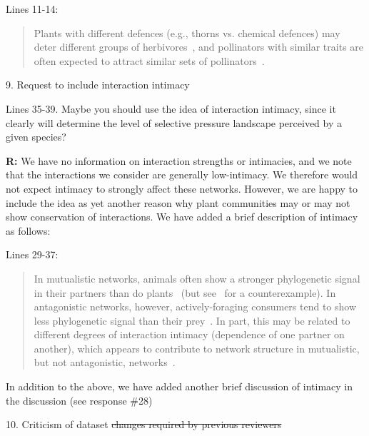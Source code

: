 \documentclass[12pt]{letter}
\newenvironment{refquote}{\bigskip \begin{it}}{\end{it}\smallskip}
\providecommand{\DIFdel}[1]{{\protect\color{red}\sout{#1}}}                      %
\providecommand{\DIFdelbegin}{} %
\providecommand{\DIFdelend}{} %
\newcommand{\DIFscaledelfig}{0.5}
\newlength{\DIFdelgraphicswidth} %
\newlength{\DIFdelgraphicsheight} %
\newcommand{\DIFdelincludegraphics}[2][]{%
\sbox{\DIFdelgraphicsbox}{\DIFOincludegraphics[#1]{#2}}%
\settoboxwidth{\DIFdelgraphicswidth}{\DIFdelgraphicsbox} %
\settoboxtotalheight{\DIFdelgraphicsheight}{\DIFdelgraphicsbox} %
\scalebox{\DIFscaledelfig}{%
\parbox[b]{\DIFdelgraphicswidth}{\usebox{\DIFdelgraphicsbox}\\[-\baselineskip] \rule{\DIFdelgraphicswidth}{0em}}\llap{\resizebox{\DIFdelgraphicswidth}{\DIFdelgraphicsheight}{%
\setlength{\unitlength}{\DIFdelgraphicswidth}%
\begin{picture}(1,1)%
\thicklines\linethickness{2pt} %
{\color[rgb]{1,0,0}\put(0,0){\framebox(1,1){}}}%
{\color[rgb]{1,0,0}\put(0,0){\line( 1,1){1}}}%
{\color[rgb]{1,0,0}\put(0,1){\line(1,-1){1}}}%
\end{picture}%
}\hspace*{3pt}}} %
} %
\DeclareRobustCommand{\DIFdelbegin}{\DIFOdelbegin \let\includegraphics\DIFdelincludegraphics} %
\DeclareRobustCommand{\DIFdelend}{\DIFOaddend \let\includegraphics\DIFOincludegraphics} %
\begin{document}
		Lines 11-14:

		\begin{quotation}

			Plants with different defences 
		  	(e.g., thorns vs. chemical defences) may deter different groups of 
		  	herbivores~\citep{Ehrlich1964,Johnson2014}, and pollinators with similar traits are often expected to attract similar sets of pollinators~\citep{Waser1996,Fenster2004,Ollerton2009}.

		\end{quotation}


	9. Request to include interaction intimacy

		\begin{refquote}
		Lines 35-39. Maybe you should use the idea of interaction intimacy, since it clearly will determine the level of selective pressure landscape perceived by a given species?
		\end{refquote}


		\textbf{R:} We have no information on interaction strengths or intimacies, and we note that the interactions we consider are generally low-intimacy. We therefore would not expect intimacy to strongly affect these networks. However, we are happy to include the idea as yet another reason why plant communities may or may not show conservation of interactions. We have added a brief description of intimacy as follows:


		Lines 29-37:

		\begin{quotation}

			In mutualistic networks, animals often show a stronger phylogenetic signal in their partners than do plants~\citep{Rezende2007a,Chamberlain2014,Rohr2014,Vamosi2014,Lind2015,Fontaine2015} (but see~\citet{Rafferty2013} for a counterexample). In antagonistic networks, however, actively-foraging consumers tend to show less phylogenetic signal than their prey~\citep{Ives2006,Cagnolo2011,Naisbit2011,Fontaine2015}. In part, this may be related to different degrees of interaction intimacy (dependence of one partner on another), which appears to contribute to network structure in mutualistic, but not antagonistic, networks~\citep{Guimaraes2007,Ponisio2017}. 

		\end{quotation}


		In addition to the above, we have added another brief discussion of intimacy in the discussion (see response \#28)


	10. Criticism of dataset \DIFdelbegin \DIFdel{changes required by previous reviewers
}\DIFdelend %
\end{document}
